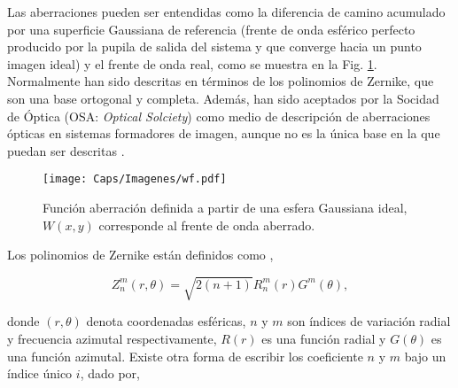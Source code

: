Las aberraciones pueden ser entendidas como la diferencia de camino acumulado por una superficie Gaussiana de referencia \cite{Goodman2005} (frente de onda esférico perfecto producido por la pupila de salida del sistema y que converge hacia un punto imagen ideal) y el frente de onda real, como se muestra en la Fig. \ref{fig:wf}. Normalmente han sido descritas en términos de los polinomios de Zernike, que son una base ortogonal y completa. Además, han sido aceptados por la Socidad de Óptica (OSA: \textit{Optical Solciety}) como medio de descripción de aberraciones ópticas en sistemas formadores de imagen, aunque no es la única base en la que puedan ser descritas \cite{Schmidt2010, Dai2008}.\\


\begin{figure}[!ht]
  \centering
    \texttt{[image: Caps/Imagenes/wf.pdf]}
  \caption[Función aberración definida a partir de una esfera Gaussiana ideal.]{Función aberración definida a partir de una esfera Gaussiana ideal, $W(x,y)$ corresponde al frente de onda aberrado.}
  \label{fig:wf}
\end{figure}

Los polinomios de Zernike están definidos como \cite{Schmidt2010},

\begin{equation}
\label{eqD10}
	Z^{m}_{n}(r,\theta) = \sqrt{2(n+1)}R^{m}_{n}(r)G^{m}(\theta),
\end{equation}

donde $(r,\theta)$ denota coordenadas esféricas, $n$ y $m$ son índices de variación radial y frecuencia azimutal respectivamente, $R(r)$ es una función radial y $G(\theta)$ es una función azimutal. Existe otra forma de escribir los coeficiente $n$ y $m$ bajo un índice único $i$, dado por,

